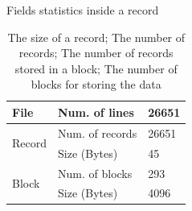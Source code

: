 \begin{table}[ht]
    \begin{minipage}{.55\textwidth}
        \renewcommand{\arraystretch}{1.2}
        \vspace{2mm}
        \caption{Fields statistics inside a record}
        \label{tab:field-stats}
    \end{minipage} 
    \hfill
    \begin{minipage}{.4\textwidth}
        \centering
        \renewcommand{\arraystretch}{1.2}
        \begin{tabular}{@{}lll@{}}
        \toprule
        File                   & Num. of lines   & 26651 \\
        \midrule
        \multirow{2}{*}{Record}& Num. of records & 26651 \\
                               & Size (Bytes)    & 45    \\
        \midrule
        \multirow{2}{*}{Block} & Num. of blocks  & 293   \\
                               & Size (Bytes)    & 4096  \\
        \bottomrule
        \end{tabular}
        \vspace{5mm}
        \caption{The size of a record; The number of
records; The number of records stored in a block; The number of blocks
for storing the data}
    \end{minipage}
\end{table}

